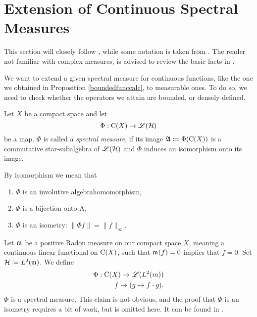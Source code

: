 
\section{Extension of Continuous Spectral Measures}

This section will closely follow \cite{LesHaupt}, while some notation
is taken from \cite[Ch. 6]{PedAnaN}. The reader not familiar
with complex measures, is advised to review the basic facts in 
\cite[Ch. 6]{RudinRealComp}.

We want to extend a given spectral measure for continuous functions,
like the one we obtained in Proposition \ref{boundedfunccalc}, to measurable ones. 
To do so, we need to check whether the operators we attain
are bounded, or densely defined.
\begin{defi}
 
 Let $X$ be a compact space and let
 \[
  \Phi : \operatorname{C} (X) \to \mathscr{L}(\mathcal{H})
 \]
be a map. $\Phi$ is called a \textit{spectral measure}, if its image 
$\mathfrak{A} \coloneqq \Phi(\operatorname{C} (X))$ is a commutative star-subalgebra of $\mathscr{L}(\mathcal{H})$ and 
$\Phi$ induces an isomorphism onto its image.
\end{defi}

\begin{rem}
 By isomorphism we mean that
 \begin{enumerate}
  \item $\Phi$ is an involutive algebrahomomorphism,
  \item $\Phi$ is a bijection onto A,
  \item $\Phi$ is an isometry: $\| \Phi f \| = \| f \|_\infty$.
 \end{enumerate}

\end{rem}

\begin{expl}
Let $\mathfrak{m}_{}$ be a positive Radon measure on our compact space $X$, meaning a
continuous linear functional on $\operatorname{C} (X)$, such that $\mathfrak{m}_{}(f) = 0$ implies 
that $f=0$. Set $\mathcal{H} \coloneqq L^2(\mathfrak{m})$.
We define 
\begin{align*}
 \Phi : \operatorname{C}(X) \to \mathscr{L}({L^2({m})}) \\
 f \mapsto (g \mapsto f\cdot g).
\end{align*}
$\Phi$ is a spectral measure. This claim is not obvious, and the proof
that $\Phi$ is an isometry requires a bit of work, but is omitted here.
It can be found in \cite{LesHaupt}. 
\end{expl}

